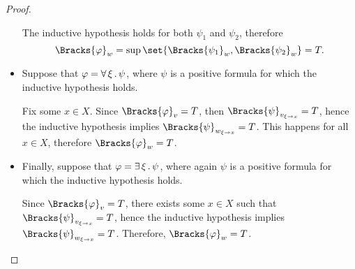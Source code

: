 \begin{proof}
\begin{itemize}
    The inductive hypothesis holds for both \( \psi_1 \) and \( \psi_2 \), therefore
    \begin{equation*}
      \Bracks{\varphi}_w = \sup\set{ \Bracks{\psi_1}_w, \Bracks{\psi_2}_w } = T.
    \end{equation*}

    \item Suppose that \( \varphi = \forall \thinspace \xi \thinspace . \thinspace \psi \), where \( \psi \) is a positive formula for which the inductive hypothesis holds.

    Fix some \( x \in X \). Since \( \Bracks{\varphi}_v = T \), then \( \Bracks{\psi}_{v_{\xi \to x}} = T \), hence the inductive hypothesis implies \( \Bracks{\psi}_{w_{\xi \to x}} = T \). This happens for all \( x \in X \), therefore \( \Bracks{\varphi}_w = T \).

    \item Finally, suppose that \( \varphi = \exists \thinspace \xi \thinspace . \thinspace \psi \), where again \( \psi \) is a positive formula for which the inductive hypothesis holds.

    Since \( \Bracks{\varphi}_v = T \), there exists some \( x \in X \) such that \( \Bracks{\psi}_{v_{\xi \to x}} = T \), hence the inductive hypothesis implies \( \Bracks{\psi}_{w_{\xi \to x}} = T \). Therefore, \( \Bracks{\varphi}_w = T \).
  \end{itemize}
\end{proof}


